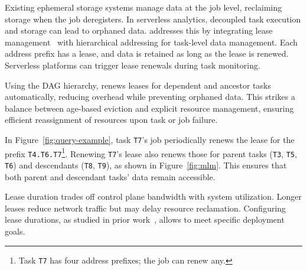Existing ephemeral storage systems manage data at the job level, reclaiming storage when the job deregisters. In serverless analytics, decoupled task execution and storage can lead to orphaned data. \jiffy addresses this by integrating lease management~\cite{gray1989leases, chubby, dhcplease} with hierarchical addressing for task-level data management. Each address prefix has a lease, and data is retained as long as the lease is renewed. Serverless platforms can trigger lease renewals during task monitoring.

Using the DAG hierarchy, \jiffy renews leases for dependent and ancestor tasks automatically, reducing overhead while preventing orphaned data. This strikes a balance between age-based eviction and explicit resource management, ensuring efficient reassignment of resources upon task or job failure.

 In Figure~\ref{fig:query-example}, task \texttt{T7}'s job periodically renews the lease for the prefix \texttt{T4.T6.T7}\footnote{Task \texttt{T7} has four address prefixes; the job can renew any.}. Renewing \texttt{T7}'s lease also renews those for parent tasks (\texttt{T3}, \texttt{T5}, \texttt{T6}) and descendants (\texttt{T8}, \texttt{T9}), as shown in Figure~\ref{fig:mlm}. This ensures that both parent and descendant tasks' data remain accessible.

 Lease duration trades off control plane bandwidth with system utilization. Longer leases reduce network traffic but may delay resource reclamation. Configuring lease durations, as studied in prior work~\cite{chubby, gray1989leases}, allows \jiffy to meet specific deployment goals.






